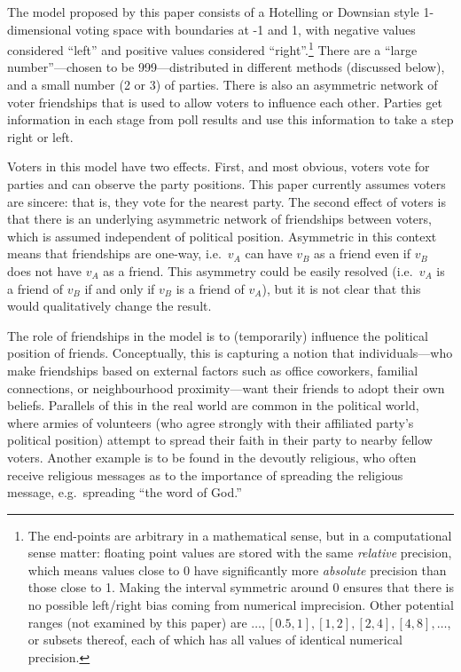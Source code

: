 \documentclass[12pt]{article}
\numberwithin{equation}{subsection}
\begin{document}
The model proposed by this paper consists of a Hotelling or Downsian style 1-dimensional voting
space with boundaries at -1 and 1, with negative values considered ``left'' and positive values
considered ``right''.\footnote{The end-points are arbitrary in a
    mathematical sense, but in a computational sense matter: floating point values are stored with
    the same \emph{relative} precision, which means values close to 0 have significantly more
    \emph{absolute} precision than those close to 1.  Making the interval symmetric around 0
    ensures that there is no possible left/right bias coming from numerical imprecision.  Other
    potential ranges (not examined by this paper) are $\hdots, [0.5, 1], [1,2], [2,4], [4,8],
    \hdots$, or subsets thereof, each of which has all values of identical numerical precision.
}  There are a ``large number''---chosen to be 999---distributed in different methods (discussed
below), and a small number (2 or 3) of parties.  There is also an asymmetric network of voter
friendships that is used to allow voters to influence each other.  Parties get information in each
stage from poll results and use this information to take a step right or left.

Voters in this model have two effects.  First, and most obvious, voters vote for parties and can
observe the party positions.  This paper currently assumes voters are sincere: that is, they vote
for the nearest party.  The second effect of voters is that there is an underlying asymmetric
network of friendships between voters, which is assumed independent of political position.
Asymmetric in this context means that friendships are one-way, i.e.\ $v_A$ can have $v_B$ as a
friend even if $v_B$ does not have $v_A$ as a friend.  This asymmetry could be easily resolved (i.e.\ $v_A$
is a friend of $v_B$ if and only if $v_B$ is a friend of $v_A$), but it is not clear that this would
qualitatively change the result.

The role of friendships in the model is to (temporarily) influence the political position of
friends.  Conceptually, this is capturing a notion that individuals---who make friendships based on
external factors such as office coworkers, familial connections, or neighbourhood proximity---want
their friends to adopt their own beliefs.  Parallels of this in the real world are common in the
political world, where armies of volunteers (who agree strongly with their affiliated party's
political position) attempt to spread their faith in their party to nearby fellow voters.  Another
example is to be found in the devoutly religious, who often receive religious messages as to the
importance of spreading the religious message, e.g.\ spreading ``the word of God.''
\end{document}
